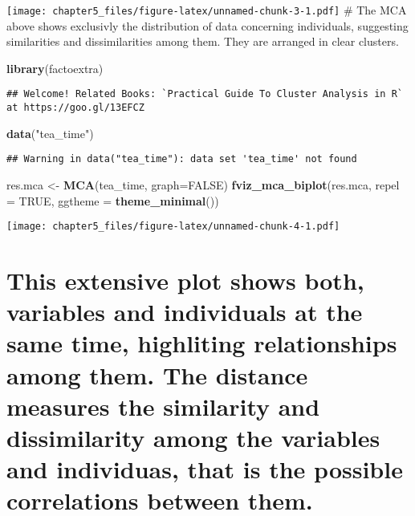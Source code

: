 \documentclass[]{article}
\newenvironment{Shaded}{\begin{snugshade}}{\end{snugshade}}
\newcommand{\DataTypeTok}[1]{\textcolor[rgb]{0.13,0.29,0.53}{#1}}
\newcommand{\KeywordTok}[1]{\textcolor[rgb]{0.13,0.29,0.53}{\textbf{#1}}}
\newcommand{\NormalTok}[1]{#1}
\newcommand{\OtherTok}[1]{\textcolor[rgb]{0.56,0.35,0.01}{#1}}
\newcommand{\StringTok}[1]{\textcolor[rgb]{0.31,0.60,0.02}{#1}}
\begin{document}
\texttt{[image: chapter5\_files/figure-latex/unnamed-chunk-3-1.pdf]} \#
The MCA above shows exclusivly the distribution of data concerning
individuals, suggesting similarities and dissimilarities among them.
They are arranged in clear clusters.

\begin{Shaded}
\begin{Highlighting}[]
\KeywordTok{library}\NormalTok{(factoextra)}
\end{Highlighting}
\end{Shaded}

\begin{verbatim}
## Welcome! Related Books: `Practical Guide To Cluster Analysis in R` at https://goo.gl/13EFCZ
\end{verbatim}

\begin{Shaded}
\begin{Highlighting}[]
\KeywordTok{data}\NormalTok{(}\StringTok{"tea_time"}\NormalTok{)}
\end{Highlighting}
\end{Shaded}

\begin{verbatim}
## Warning in data("tea_time"): data set 'tea_time' not found
\end{verbatim}

\begin{Shaded}
\begin{Highlighting}[]
\NormalTok{res.mca <-}\StringTok{ }\KeywordTok{MCA}\NormalTok{(tea_time, }\DataTypeTok{graph=}\OtherTok{FALSE}\NormalTok{)}
\KeywordTok{fviz_mca_biplot}\NormalTok{(res.mca, }\DataTypeTok{repel =} \OtherTok{TRUE}\NormalTok{, }\DataTypeTok{ggtheme =} \KeywordTok{theme_minimal}\NormalTok{())}
\end{Highlighting}
\end{Shaded}

\texttt{[image: chapter5\_files/figure-latex/unnamed-chunk-4-1.pdf]}

\hypertarget{this-extensive-plot-shows-both-variables-and-individuals-at-the-same-time-highliting-relationships-among-them.-the-distance-measures-the-similarity-and-dissimilarity-among-the-variables-and-individuas-that-is-the-possible-correlations-between-them.}{%
\section{This extensive plot shows both, variables and individuals at
the same time, highliting relationships among them. The distance
measures the similarity and dissimilarity among the variables and
individuas, that is the possible correlations between
them.}\label{this-extensive-plot-shows-both-variables-and-individuals-at-the-same-time-highliting-relationships-among-them.-the-distance-measures-the-similarity-and-dissimilarity-among-the-variables-and-individuas-that-is-the-possible-correlations-between-them.}}
\end{document}
